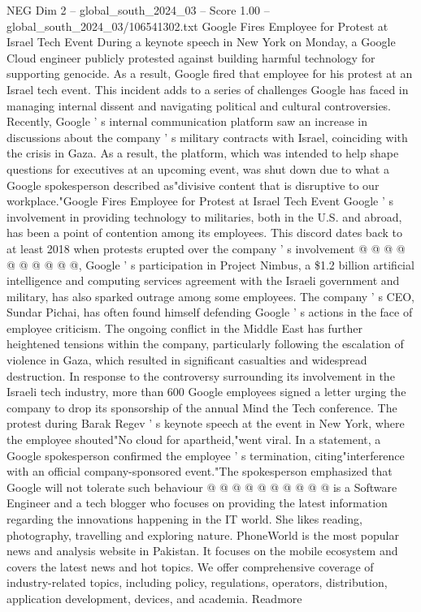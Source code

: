 \begin{textsample}{NEG Dim 2 – global\_south\_2024\_03 – Score 1.00 – global\_south\_2024\_03/106541302.txt}  \label{ex:f2_neg_437}
Google Fires Employee for Protest at Israel Tech Event During a keynote speech in New York on Monday, a Google Cloud engineer publicly protested against building harmful technology for supporting genocide.
As a result, Google fired that employee for his protest at an Israel tech event.
This incident adds to a series of challenges Google has faced in managing internal dissent and navigating political and cultural controversies.
Recently, Google ' s internal communication platform saw an increase in discussions about the company ' s military contracts with Israel, coinciding with the crisis in Gaza.
As a result, the platform, which was intended to help shape questions for executives at an upcoming event, was shut down due to what a Google spokesperson described as"divisive content that is disruptive to our workplace."Google Fires Employee for Protest at Israel Tech Event Google ' s involvement in providing technology to militaries, both in the U.S. and abroad, has been a point of contention among its employees.
This discord dates back to at least 2018 when protests erupted over the company ' s involvement @ @ @ @ @ @ @ @ @ @, Google ' s participation in Project Nimbus, a \$1.2 billion artificial intelligence and computing services agreement with the Israeli government and military, has also sparked outrage among some employees.
The company ' s CEO, Sundar Pichai, has often found himself defending Google ' s actions in the face of employee criticism.
The ongoing conflict in the Middle East has further heightened tensions within the company, particularly following the escalation of violence in Gaza, which resulted in significant casualties and widespread destruction.
In response to the controversy surrounding its involvement in the Israeli tech industry, more than 600 Google employees signed a letter urging the company to drop its sponsorship of the annual Mind the Tech conference.
The protest during Barak Regev ' s keynote speech at the event in New York, where the employee shouted"No cloud for apartheid,"went viral.
In a statement, a Google spokesperson confirmed the employee ' s termination, citing"interference with an official company-sponsored event."The spokesperson emphasized that Google will not tolerate such behaviour @ @ @ @ @ @ @ @ @ @ is a Software Engineer and a tech blogger who focuses on providing the latest information regarding the innovations happening in the IT world.
She likes reading, photography, travelling and exploring nature.
PhoneWorld is the most popular news and analysis website in Pakistan.
It focuses on the mobile ecosystem and covers the latest news and hot topics.
We offer comprehensive coverage of industry-related topics, including policy, regulations, operators, distribution, application development, devices, and academia.
Readmore

\end{textsample}
